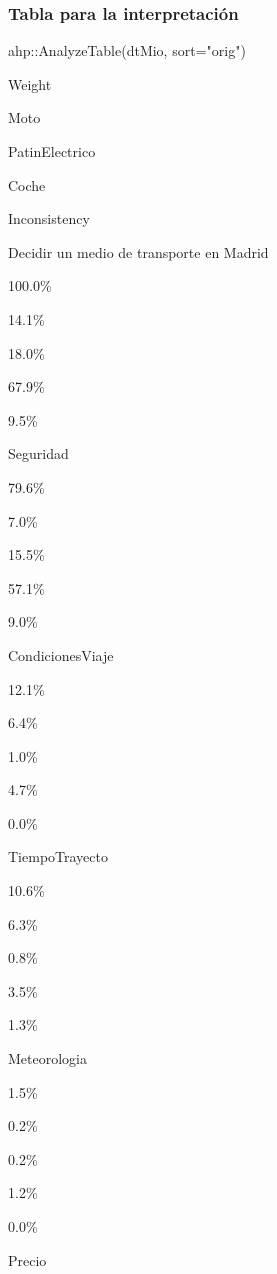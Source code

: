 \documentclass[
]{article}
\newenvironment{Shaded}{\begin{snugshade}}{\end{snugshade}}
\newcommand{\AttributeTok}[1]{\textcolor[rgb]{0.77,0.63,0.00}{#1}}
\newcommand{\FunctionTok}[1]{\textcolor[rgb]{0.00,0.00,0.00}{#1}}
\newcommand{\NormalTok}[1]{#1}
\newcommand{\SpecialCharTok}[1]{\textcolor[rgb]{0.00,0.00,0.00}{#1}}
\newcommand{\StringTok}[1]{\textcolor[rgb]{0.31,0.60,0.02}{#1}}
\begin{document}
\hypertarget{tabla-para-la-interpretaciuxf3n}{%
\subsubsection{Tabla para la
interpretación}\label{tabla-para-la-interpretaciuxf3n}}

\begin{Shaded}
\begin{Highlighting}[]
\NormalTok{ahp}\SpecialCharTok{::}\FunctionTok{AnalyzeTable}\NormalTok{(dtMio, }\AttributeTok{sort=}\StringTok{"orig"}\NormalTok{)}
\end{Highlighting}
\end{Shaded}

Weight

Moto

PatinElectrico

Coche

Inconsistency

{Decidir un medio de transporte en Madrid}

{100.0\%}

{14.1\%}

{18.0\%}

{67.9\%}

{ 9.5\% }

{Seguridad }

{79.6\%}

{7.0\%}

{15.5\%}

{57.1\%}

{ 9.0\% }

{CondicionesViaje }

{12.1\%}

{6.4\%}

{1.0\%}

{4.7\%}

{ 0.0\% }

{TiempoTrayecto }

{10.6\%}

{6.3\%}

{0.8\%}

{3.5\%}

{ 1.3\% }

{Meteorologia }

{1.5\%}

{0.2\%}

{0.2\%}

{1.2\%}

{ 0.0\% }

{Precio }
\end{document}
